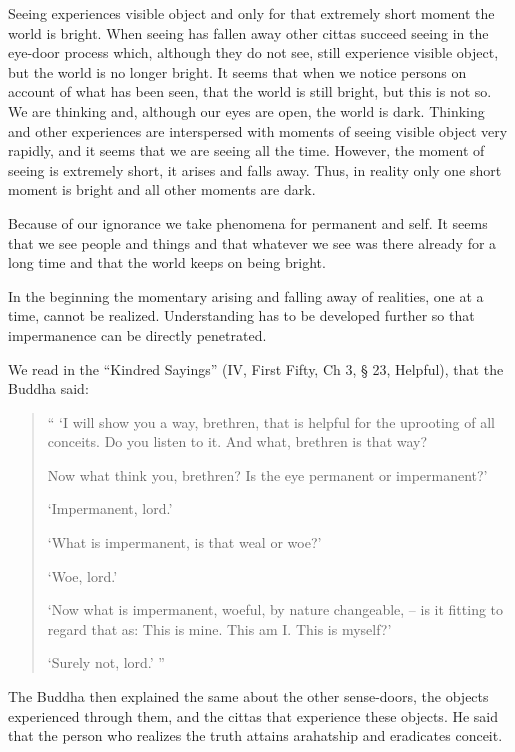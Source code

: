 Seeing experiences visible object and only for that extremely short
moment the world is bright. When seeing has fallen away other cittas
succeed seeing in the eye-door process which, although they do not see,
still experience visible object, but the world is no longer bright. It
seems that when we notice persons on account of what has been seen, that
the world is still bright, but this is not so. We are thinking and,
although our eyes are open, the world is dark. Thinking and other
experiences are interspersed with moments of seeing visible object very
rapidly, and it seems that we are seeing all the time. However, the
moment of seeing is extremely short, it arises and falls away. Thus, in
reality only one short moment is bright and all other moments are dark.

Because of our ignorance we take phenomena for permanent and self. It
seems that we see people and things and that whatever we see was there
already for a long time and that the world keeps on being bright.

In the beginning the momentary arising and falling away of realities,
one at a time, cannot be realized. Understanding has to be developed
further so that impermanence can be directly penetrated.

We read in the ``Kindred Sayings'' (IV, First Fifty, Ch 3, § 23,
Helpful), that the Buddha said:

\begin{quote}
`` `I will show you a way, brethren, that is helpful for the uprooting
of all conceits. Do you listen to it. And what, brethren is that way?

Now what think you, brethren? Is the eye permanent or impermanent?'

`Impermanent, lord.'

`What is impermanent, is that weal or woe?'

`Woe, lord.'

`Now what is impermanent, woeful, by nature changeable, -- is it fitting
to regard that as: This is mine. This am I. This is myself?'

`Surely not, lord.' ''
\end{quote}

The Buddha then explained the same about the other sense-doors, the
objects experienced through them, and the cittas that experience these
objects. He said that the person who realizes the truth attains
arahatship and eradicates conceit.

